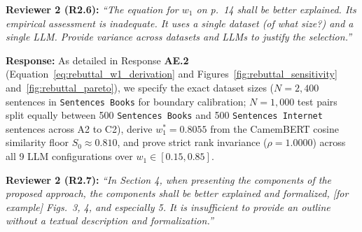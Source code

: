 \documentclass[11pt,a4paper]{article}
\begin{document}
\begin{reviewbox}
\textbf{Reviewer 2 (R2.6):} \textit{``The equation for $w_1$ on p.\ 14 shall be better explained. Its empirical assessment is inadequate. It uses a single dataset (of what size?) and a single LLM. Provide variance across datasets and LLMs to justify the selection.''}
\end{reviewbox}

\noindent\textbf{Response:}
As detailed in Response \textbf{AE.2} (Equation~\ref{eq:rebuttal_w1_derivation} and Figures~\ref{fig:rebuttal_sensitivity} and~\ref{fig:rebuttal_pareto}), we specify the exact dataset sizes ($N = 2{,}400$ sentences in \texttt{Sentences Books} for boundary calibration; $N = 1{,}000$ test pairs split equally between 500 \texttt{Sentences Books} and 500 \texttt{Sentences Internet} sentences across A2 to C2), derive $w_1^* = 0.8055$ from the CamemBERT cosine similarity floor $S_0 \approx 0.810$, and prove strict rank invariance ($\rho = 1.0000$) across all 9 LLM configurations over $w_1 \in [0.15, 0.85]$.

\begin{reviewbox}
\textbf{Reviewer 2 (R2.7):} \textit{``In Section 4, when presenting the components of the proposed approach, the components shall be better explained and formalized, [for example] Figs.\ 3, 4, and especially 5. It is insufficient to provide an outline without a textual description and formalization.''}
\end{reviewbox}
\end{document}
